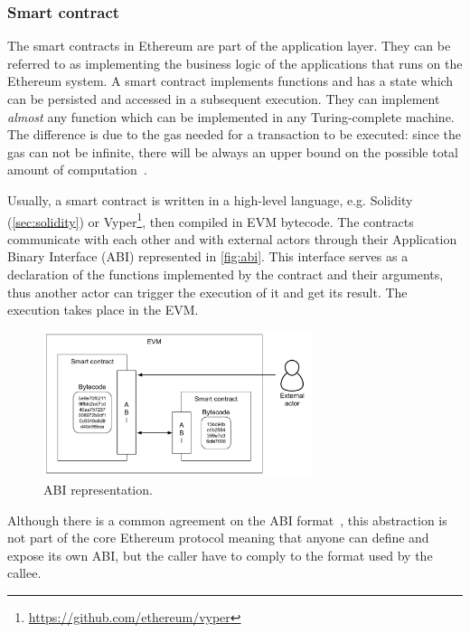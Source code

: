 \subsubsection{Smart contract}
\label{sec:smart-contract}

The smart contracts in Ethereum are part of the application layer. They can be
referred to as implementing the business logic of the applications that runs on
the Ethereum system. A smart contract implements functions and has a state which
can be persisted and accessed in a subsequent execution. They can implement
\emph{almost} any function which can be implemented in any Turing-complete
machine. The difference is due to the gas needed for a transaction to be
executed: since the gas can not be infinite, there will be always an upper bound
on the possible total amount of computation~\cite{wood2018ethereum}.

Usually, a smart contract is written in a high-level language, e.g. Solidity
(\autoref{sec:solidity}) or
Vyper\footnote{\url{https://github.com/ethereum/vyper}}, then compiled in EVM
bytecode. The contracts communicate with each other and with external actors
through their Application Binary Interface (ABI) represented in
\autoref{fig:abi}. This interface serves as a declaration of the functions
implemented by the contract and their arguments, thus another actor can trigger
the execution of it and get its result. The execution takes place in the EVM.

\begin{figure}
	\begin{center}
		\includegraphics[width=0.7\textwidth]{./res/img/abi.pdf}
	\end{center}
	\caption{ABI representation.}
	\label{fig:abi}
\end{figure}

Although there is a common agreement on the ABI format~\cite{bib:solidity-docs},
this abstraction is not part of the core Ethereum protocol meaning that anyone
can define and expose its own ABI, but the caller have to comply to the format
used by the callee.
